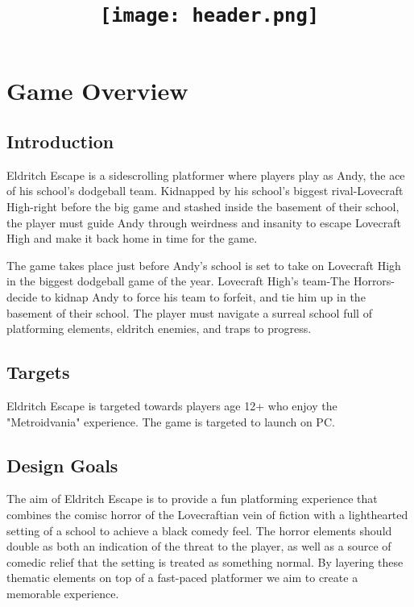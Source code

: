 \documentclass [12pt]{article}
\title{\texttt{[image: header.png]}}
\date{}
\begin{document}
\maketitle
\newpage

\section*{Game Overview}

\subsection*{Introduction}

Eldritch Escape is a sidescrolling platformer where players play as Andy, the ace of his school's dodgeball team. Kidnapped by his school's biggest rival-Lovecraft High-right before the big game and stashed inside the basement of their school, the player must guide Andy through weirdness and insanity to escape Lovecraft High and make it back home in time for the game.

The game takes place just before Andy's school is set to take on Lovecraft High in the biggest dodgeball game of the year. Lovecraft High's team-The Horrors-decide to kidnap Andy to force  his team to forfeit, and tie him up in the basement of their school. The player must navigate a surreal school full of platforming elements, eldritch enemies, and traps to progress.

\subsection*{Targets}

Eldritch Escape is targeted towards players age 12+ who enjoy the "Metroidvania" experience. The game is targeted to launch on PC.

\subsection*{Design Goals}

The aim of Eldritch Escape is to provide a fun platforming experience that combines the comisc horror of the Lovecraftian vein of fiction with a lighthearted setting of a school to achieve a black comedy feel. The horror elements should double as both an indication of the threat to the player, as well as a source of comedic relief that the setting is treated as something normal. By layering these thematic elements on top of a fast-paced platformer we aim to create a memorable experience.
\end{document}
